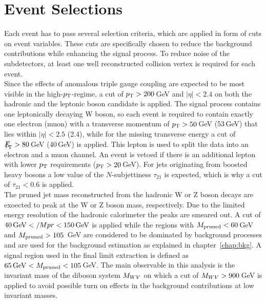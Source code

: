 \section{Event Selections}
\label{sec:eventselection}
Each event has to pass several selection criteria, which are applied in form of cuts on event variables. These cuts are specifically chosen to reduce the background contributions while enhancing the signal process. To reduce noise of the subdetectors, at least one well reconstructed collision vertex is required for each event.\\

\noindent Since the effects of anomalous triple gauge coupling are expected to be most visible in the high-$p_{\rm T}$-regime, a cut of $p_{\rm T}>200$\,GeV and $|\eta|<2.4$ on both the hadronic and the leptonic boson candidate is applied. The signal process contains one leptonically decaying W boson, so each event is required to contain exactly one electron (muon) with a transverse momentum of $p_{\rm T}>50$\,GeV (53\,GeV) that lies within $|\eta|<2.5$ (2.4), while for the missing transverse energy a cut of ${E\!\!\!\!/}_{\!\mathrm{T}} >80$\,GeV (40\,GeV) is applied. This lepton is used to split the data into an electron and a muon channel. An event is vetoed if there is an additional lepton with lower $p_{\rm T}$ requirements ($p_{\rm T}>20$\,GeV).  For jets originating from boosted heavy bosons a low value of the $N$-subjettiness $\tau_{21}$ is expected, which is why a cut of $\tau_{21}<0.6$ is applied.\\

\noindent The pruned jet mass reconstructed from the hadronic W or Z boson decays are exoected to peak at the W or Z boson mass, respectively. Due to the limited energy resolution of the hadronic calorimeter the peaks are smeared out. A cut of $40\,{\rm GeV}</Mpr<150\,{\rm GeV}$ is applied while the regions with $M_\mathrm{pruned}<60$\,GeV and $M_\mathrm{pruned}>105$\, GeV are considered to be dominated by background processes and are used for the background estimation as explained in chapter~\ref{chap:bkg}. A signal region used in the final limit extraction is defined as $65\,{\rm GeV}<M_\mathrm{pruned}<105$\,GeV. The main observable in this analysis is the invariant mass of the diboson system $M_{WV}$ on which a cut of $M_{WV}>900$\,GeV is applied to avoid possible turn on effects in the background contributions at low invariant masses.

